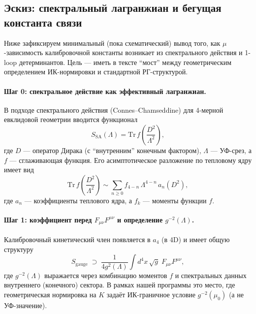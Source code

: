 \documentclass[12pt]{article}
\begin{document}
\subsection*{Эскиз: спектральный лагранжиан и бегущая константа связи}
Ниже зафиксируем минимальный (пока схематический) вывод того, как $\mu$-зависимость калибровочной константы возникает из спектрального действия и 1-loop детерминантов.
Цель --- иметь в тексте ``мост'' между геометрическим определением ИК-нормировки и стандартной РГ-структурой.

\paragraph{Шаг 0: спектральное действие как эффективный лагранжиан.}
В подходе спектрального действия (Connes--Chamseddine) для 4-мерной евклидовой геометрии вводится функционал
\begin{equation}
S_{\mathrm{SA}}(\Lambda)=\mathrm{Tr}\, f\!\left(\frac{D^2}{\Lambda^2}\right),
\end{equation}
где $D$ --- оператор Дирака (с ``внутренним'' конечным фактором), $\Lambda$ --- УФ-срез, а $f$ --- сглаживающая функция.
Его асимптотическое разложение по тепловому ядру имеет вид
\begin{equation}
\mathrm{Tr}\, f\!\left(\frac{D^2}{\Lambda^2}\right)
\sim
\sum_{n\ge 0} f_{4-n}\,\Lambda^{4-n}\, a_n(D^2),
\end{equation}
где $a_n$ --- коэффициенты теплового ядра, а $f_{k}$ --- моменты функции $f$.

\paragraph{Шаг 1: коэффициент перед $F_{\mu\nu}F^{\mu\nu}$ и определение $g^{-2}(\Lambda)$.}
Калибровочный кинетический член появляется в $a_4$ (в 4D) и имеет общую структуру
\begin{equation}
S_{\mathrm{gauge}}\;\supset\; \frac{1}{4 g^2(\Lambda)}\int d^4x\,\sqrt{g}\; F_{\mu\nu}F^{\mu\nu},
\end{equation}
где $g^{-2}(\Lambda)$ выражается через комбинацию моментов $f$ и спектральных данных внутреннего (конечного) сектора.
В рамках нашей программы это место, где геометрическая нормировка на $K$ задаёт ИК-граничное условие $g^{-2}(\mu_0)$ (а не УФ-значение).
\end{document}
